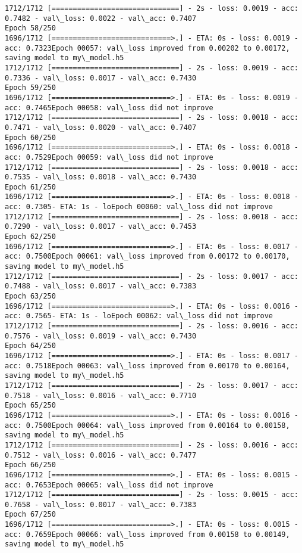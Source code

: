 \documentclass[11pt]{article}
\begin{document}
\begin{Verbatim}[commandchars=\\\{\}]
1712/1712 [==============================] - 2s - loss: 0.0019 - acc: 0.7482 - val\_loss: 0.0022 - val\_acc: 0.7407
Epoch 58/250
1696/1712 [============================>.] - ETA: 0s - loss: 0.0019 - acc: 0.7323Epoch 00057: val\_loss improved from 0.00202 to 0.00172, saving model to my\_model.h5
1712/1712 [==============================] - 2s - loss: 0.0019 - acc: 0.7336 - val\_loss: 0.0017 - val\_acc: 0.7430
Epoch 59/250
1696/1712 [============================>.] - ETA: 0s - loss: 0.0019 - acc: 0.7465Epoch 00058: val\_loss did not improve
1712/1712 [==============================] - 2s - loss: 0.0018 - acc: 0.7471 - val\_loss: 0.0020 - val\_acc: 0.7407
Epoch 60/250
1696/1712 [============================>.] - ETA: 0s - loss: 0.0018 - acc: 0.7529Epoch 00059: val\_loss did not improve
1712/1712 [==============================] - 2s - loss: 0.0018 - acc: 0.7535 - val\_loss: 0.0018 - val\_acc: 0.7430
Epoch 61/250
1696/1712 [============================>.] - ETA: 0s - loss: 0.0018 - acc: 0.7305- ETA: 1s - loEpoch 00060: val\_loss did not improve
1712/1712 [==============================] - 2s - loss: 0.0018 - acc: 0.7290 - val\_loss: 0.0017 - val\_acc: 0.7453
Epoch 62/250
1696/1712 [============================>.] - ETA: 0s - loss: 0.0017 - acc: 0.7500Epoch 00061: val\_loss improved from 0.00172 to 0.00170, saving model to my\_model.h5
1712/1712 [==============================] - 2s - loss: 0.0017 - acc: 0.7488 - val\_loss: 0.0017 - val\_acc: 0.7383
Epoch 63/250
1696/1712 [============================>.] - ETA: 0s - loss: 0.0016 - acc: 0.7565- ETA: 1s - loEpoch 00062: val\_loss did not improve
1712/1712 [==============================] - 2s - loss: 0.0016 - acc: 0.7576 - val\_loss: 0.0019 - val\_acc: 0.7430
Epoch 64/250
1696/1712 [============================>.] - ETA: 0s - loss: 0.0017 - acc: 0.7518Epoch 00063: val\_loss improved from 0.00170 to 0.00164, saving model to my\_model.h5
1712/1712 [==============================] - 2s - loss: 0.0017 - acc: 0.7518 - val\_loss: 0.0016 - val\_acc: 0.7710
Epoch 65/250
1696/1712 [============================>.] - ETA: 0s - loss: 0.0016 - acc: 0.7500Epoch 00064: val\_loss improved from 0.00164 to 0.00158, saving model to my\_model.h5
1712/1712 [==============================] - 2s - loss: 0.0016 - acc: 0.7512 - val\_loss: 0.0016 - val\_acc: 0.7477
Epoch 66/250
1696/1712 [============================>.] - ETA: 0s - loss: 0.0015 - acc: 0.7653Epoch 00065: val\_loss did not improve
1712/1712 [==============================] - 2s - loss: 0.0015 - acc: 0.7658 - val\_loss: 0.0017 - val\_acc: 0.7383
Epoch 67/250
1696/1712 [============================>.] - ETA: 0s - loss: 0.0015 - acc: 0.7659Epoch 00066: val\_loss improved from 0.00158 to 0.00149, saving model to my\_model.h5

\end{Verbatim}
\end{document}
